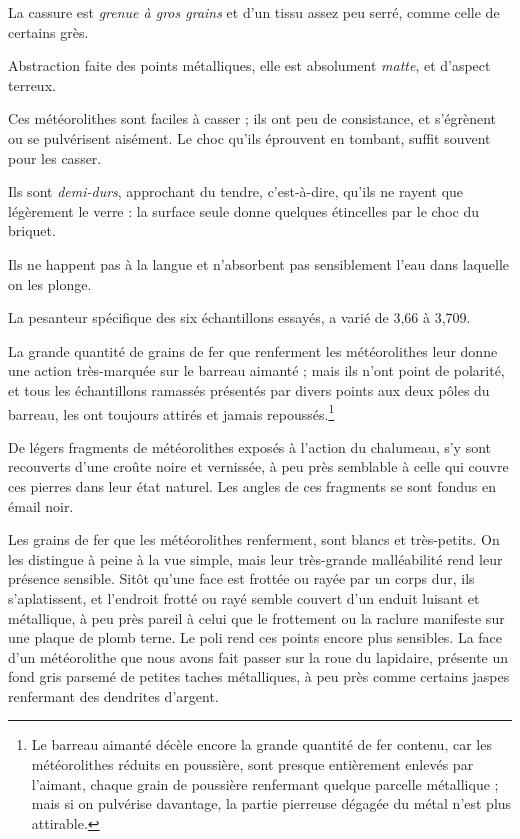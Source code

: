 \documentclass[a4paper, 12pt, oneside, french]{article}
\begin{document}
\og La cassure est \emph{grenue à gros grains} et d'un tissu assez peu serré, comme celle de certains grès. \fg

\og Abstraction faite des points métalliques, elle est absolument \emph{matte}, et d'aspect terreux. \fg

\og Ces météorolithes sont faciles à casser ; ils ont peu de consistance, et s'égrènent ou se pulvérisent aisément. Le choc qu'ils éprouvent en tombant, suffit souvent pour les casser. \fg

\og Ils sont \emph{demi-durs}, approchant du tendre, c'est-à-dire, qu'ils ne rayent que légèrement le verre : la surface seule donne quelques étincelles par le choc du briquet. \fg

\og Ils ne happent pas à la langue et n'absorbent pas sensiblement l'eau dans laquelle on les plonge. \fg

\og La pesanteur spécifique des six échantillons essayés, a varié de 3,66 à 3,709. \fg

\og La grande quantité de grains de fer que renferment les météorolithes leur donne une action très-marquée sur le barreau aimanté ; mais ils n'ont point de polarité, et tous les échantillons ramassés présentés par divers points aux deux pôles du barreau, les ont toujours attirés et jamais repoussés.\footnote{\og Le barreau aimanté décèle encore la grande quantité de fer contenu, car les météorolithes réduits en poussière, sont presque entièrement enlevés par l'aimant, chaque grain de poussière renfermant quelque parcelle métallique ; mais si on pulvérise davantage, la partie pierreuse dégagée du métal n'est plus attirable. \fg} \fg

\og De légers fragments de météorolithes exposés à l'action du chalumeau, s'y sont recouverts d'une croûte noire et vernissée, à peu près semblable à celle qui couvre ces pierres dans leur état naturel. Les angles de ces fragments se sont fondus en émail noir. \fg

\og Les grains de fer que les météorolithes renferment, sont blancs et très-petits. On les distingue à peine à la vue simple, mais leur très-grande malléabilité rend leur présence sensible. Sitôt qu'une face est frottée ou rayée par un corps dur, ils s'aplatissent, et l'endroit frotté ou rayé semble couvert d'un enduit luisant et métallique, à peu près pareil à celui que le frottement ou la raclure manifeste sur une plaque de plomb terne. Le poli rend ces points encore plus sensibles. La face d'un météorolithe que nous avons fait passer sur la roue du lapidaire, présente un fond gris parsemé de petites taches métalliques, à peu près comme certains jaspes renfermant des dendrites d'argent. \fg
\end{document}

